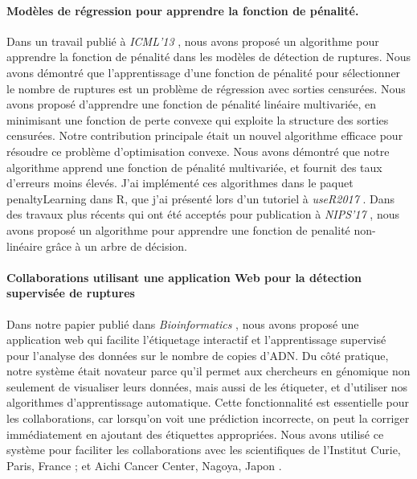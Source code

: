 \documentclass{article}
\begin{document}
\paragraph{Modèles de régression pour apprendre la fonction de pénalité.}

Dans un travail publié à \emph{ICML'13} \citep{HOCKING-penalties},
nous avons proposé un algorithme pour apprendre la fonction de
pénalité dans les modèles de détection de ruptures. Nous avons
démontré que l'apprentissage d'une fonction de pénalité pour
sélectionner le nombre de ruptures est un problème de régression avec
sorties censurées. Nous avons proposé d'apprendre une fonction de
pénalité linéaire multivariée, en minimisant une fonction de perte convexe qui
exploite la structure des sorties censurées. Notre contribution
principale était un nouvel algorithme efficace pour résoudre ce
problème d'optimisation convexe. Nous avons démontré que notre
algorithme apprend une fonction de pénalité multivariée, et fournit
des taux d'erreurs moins élevés. J'ai implémenté ces algorithmes dans le paquet
penaltyLearning dans R, que j'ai présenté lors d'un tutoriel à
\emph{useR2017} \citep{change-tutorial}. Dans des travaux plus récents
qui ont été acceptés pour publication à \emph{NIPS'17} \citep{MMIT},
nous avons proposé un algorithme pour apprendre une fonction de
penalité non-linéaire grâce à un arbre de décision.

\paragraph{Collaborations utilisant une application Web pour la
  détection supervisée de ruptures} Dans notre papier publié dans
\emph{Bioinformatics} \citep{hocking-SegAnnDB}, nous avons proposé une
application web qui facilite l'étiquetage interactif et
l'apprentissage supervisé pour l'analyse des données sur le nombre de
copies d'ADN. Du côté pratique, notre système était novateur parce
qu'il permet aux chercheurs en génomique non seulement de visualiser
leurs données, mais aussi de les étiqueter, et d'utiliser nos algorithmes d'apprentissage automatique. Cette fonctionnalité est
essentielle pour les collaborations, car lorsqu'on voit une prédiction
incorrecte, on peut la corriger immédiatement en ajoutant des
étiquettes appropriées. 
Nous avons utilisé ce système pour faciliter les
collaborations avec les scientifiques de l'Institut Curie, Paris,
France \citep{Chicard}; et Aichi Cancer Center, Nagoya, Japon
\citep{Hocking-Leukemia-2016,m14:clonal}.
\end{document}
